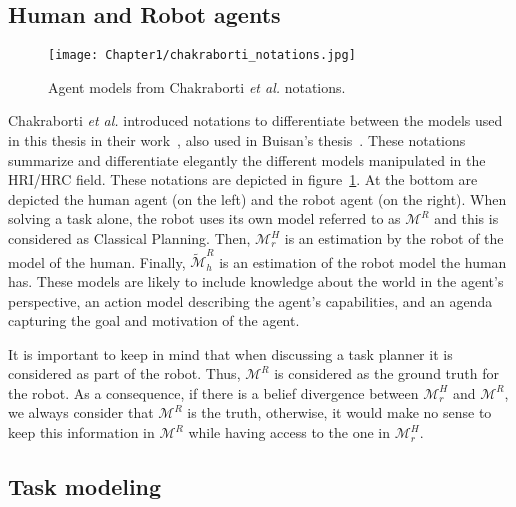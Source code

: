 \subsection{Human and Robot agents}

\begin{figure}
    \centering
    \texttt{[image: Chapter1/chakraborti\_notations.jpg]}
    \caption{Agent models from Chakraborti \textit{et al.} notations.}
    \label{fig:chakraborti_notations}
\end{figure}

Chakraborti \textit{et al.} introduced notations to differentiate between the models used in this thesis in their work~\cite{ChakrabortiBTZS15}, also used in Buisan's thesis~\cite{thesisBuisan21}. These notations summarize and differentiate elegantly the different models manipulated in the HRI/HRC field. These notations are depicted in figure~\ref{fig:chakraborti_notations}. At the bottom are depicted the human agent (on the left) and the robot agent (on the right). When solving a task alone, the robot uses its own model referred to as $\mathcal{M}^R$ and this is considered as Classical Planning. 
Then, $\mathcal{M}^H_r$ is an estimation by the robot of the model of the human. Finally, $\tilde{\mathcal{M}}^R_h$ is an estimation of the robot model the human has. These models are likely to include knowledge about the world in the agent's perspective, an action model describing the agent's capabilities, and an agenda capturing the goal and motivation of the agent.

It is important to keep in mind that when discussing a task planner it is considered as part of the robot. Thus, $\mathcal{M}^R$ is considered as the ground truth for the robot. As a consequence, if there is a belief divergence between $\mathcal{M}^H_r$ and $\mathcal{M}^R$, we always consider that $\mathcal{M}^R$ is the truth, otherwise, it would make no sense to keep this information in $\mathcal{M}^R$ while having access to the one in $\mathcal{M}^H_r$.

\subsection{Task modeling}

